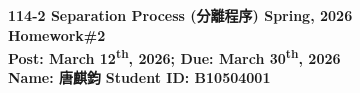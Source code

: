 \documentclass[12pt,a4paper]{article}
\begin{document}


\newcommand{\problem}[1]{%
  \item \underline{\textbf{Problem \arabic{problemsi} -- #1}}\par\vspace{0.2cm}
}

\begin{center}
    {\large \textbf{114-2 Separation Process (分離程序) Spring, 2026}}\\[0.3cm]
    {\Large \textbf{Homework\#2}}\\[0.3cm]
    {\textbf{Post: March 12\textsuperscript{th}, 2026; Due: March 30\textsuperscript{th}, 2026}}\\[0.4cm]
    \textbf{Name: 唐麒鈞} \textbf{Student ID: B10504001}
\end{center}
\vspace{0.8cm}
\end{document}
